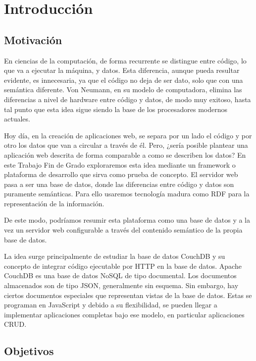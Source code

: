 \documentclass[openright,twoside,12pt]{book}
\begin{document}
\listoffigures

\listoftables


\chapter{Introducción}

\section{Motivación}

En ciencias de la computación, de forma recurrente se distingue entre código, lo que va a ejecutar la máquina, y datos.
Esta diferencia, aunque pueda resultar evidente, es innecesaria, ya que el código no deja de ser dato, solo que con una semántica diferente.
Von Neumann, en su modelo de computadora\cite{wiki:neumann}, elimina las diferencias a nivel de hardware entre código y datos, de modo muy exitoso, hasta tal punto que esta idea sigue siendo la base de los procesadores modernos actuales.

Hoy día, en la creación de aplicaciones web, se separa por un lado el código y por otro los datos que van a circular a través de él. 
Pero, ¿sería posible plantear una aplicación web descrita de forma comparable a como se describen los datos? En este Trabajo Fin de Grado exploraremos esta idea mediante un framework o plataforma de desarrollo que sirva como prueba de concepto. El servidor web pasa a ser una base de datos, donde las diferencias entre código y datos son puramente semánticas. Para ello usaremos tecnología madura como RDF para la representación de la información.\cite{rdf}

De este modo, podríamos resumir esta plataforma como una base de datos y a la vez un servidor web configurable a través del contenido semántico de la propia base de datos.

La idea surge principalmente de estudiar la base de datos CouchDB y su concepto de integrar código ejecutable por HTTP en la base de datos. Apache CouchDB es una base de datos NoSQL de tipo documental. Los documentos almacenados son de tipo JSON, generalmente sin esquema. Sin embargo, hay ciertos documentos especiales que representan vistas de la base de datos. Estas se programan en JavaScript y debido a su flexibilidad, se pueden llegar a implementar aplicaciones completas bajo ese modelo, en particular aplicaciones CRUD.\cite{couchapp}

\section{Objetivos}
\end{document}
